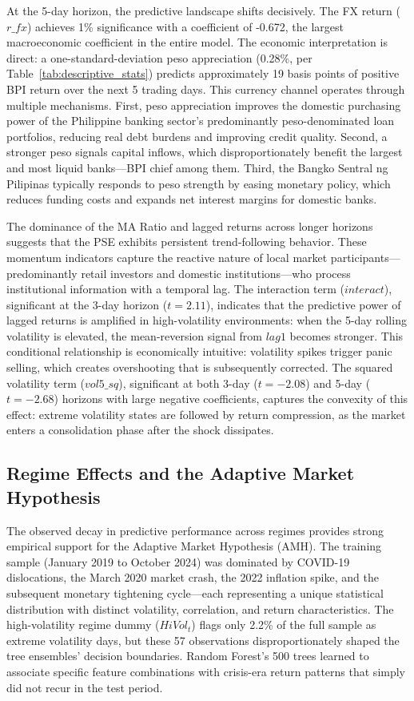 \documentclass[12pt]{article}
\begin{document}
At the 5-day horizon, the predictive landscape shifts decisively. The FX return ($r\_fx$) achieves 1\% significance with a coefficient of -0.672, the largest macroeconomic coefficient in the entire model. The economic interpretation is direct: a one-standard-deviation peso appreciation (0.28\%, per Table~\ref{tab:descriptive_stats}) predicts approximately 19 basis points of positive BPI return over the next 5 trading days. This currency channel operates through multiple mechanisms. First, peso appreciation improves the domestic purchasing power of the Philippine banking sector's predominantly peso-denominated loan portfolios, reducing real debt burdens and improving credit quality. Second, a stronger peso signals capital inflows, which disproportionately benefit the largest and most liquid banks---BPI chief among them. Third, the Bangko Sentral ng Pilipinas typically responds to peso strength by easing monetary policy, which reduces funding costs and expands net interest margins for domestic banks.

The dominance of the MA Ratio and lagged returns across longer horizons suggests that the PSE exhibits persistent trend-following behavior. These momentum indicators capture the reactive nature of local market participants---predominantly retail investors and domestic institutions---who process institutional information with a temporal lag. The interaction term ($interact$), significant at the 3-day horizon ($t = 2.11$), indicates that the predictive power of lagged returns is amplified in high-volatility environments: when the 5-day rolling volatility is elevated, the mean-reversion signal from $lag1$ becomes stronger. This conditional relationship is economically intuitive: volatility spikes trigger panic selling, which creates overshooting that is subsequently corrected. The squared volatility term ($vol5\_sq$), significant at both 3-day ($t = -2.08$) and 5-day ($t = -2.68$) horizons with large negative coefficients, captures the convexity of this effect: extreme volatility states are followed by return compression, as the market enters a consolidation phase after the shock dissipates.

\subsection{Regime Effects and the Adaptive Market Hypothesis}

The observed decay in predictive performance across regimes provides strong empirical support for the Adaptive Market Hypothesis (AMH). The training sample (January 2019 to October 2024) was dominated by COVID-19 dislocations, the March 2020 market crash, the 2022 inflation spike, and the subsequent monetary tightening cycle---each representing a unique statistical distribution with distinct volatility, correlation, and return characteristics. The high-volatility regime dummy ($HiVol_t$) flags only 2.2\% of the full sample as extreme volatility days, but these 57 observations disproportionately shaped the tree ensembles' decision boundaries. Random Forest's 500 trees learned to associate specific feature combinations with crisis-era return patterns that simply did not recur in the test period.
\end{document}
